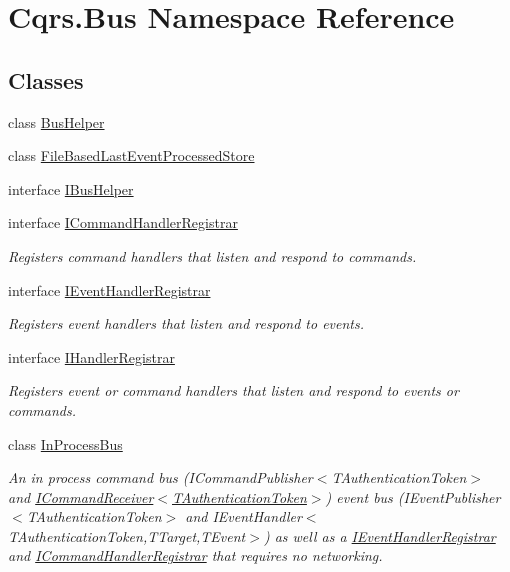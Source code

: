 \hypertarget{namespaceCqrs_1_1Bus}{}\section{Cqrs.\+Bus Namespace Reference}
\label{namespaceCqrs_1_1Bus}
\subsection*{Classes}
\begin{DoxyCompactItemize}
\item 
class \hyperlink{classCqrs_1_1Bus_1_1BusHelper}{Bus\+Helper}
\item 
class \hyperlink{classCqrs_1_1Bus_1_1FileBasedLastEventProcessedStore}{File\+Based\+Last\+Event\+Processed\+Store}
\item 
interface \hyperlink{interfaceCqrs_1_1Bus_1_1IBusHelper}{I\+Bus\+Helper}
\item 
interface \hyperlink{interfaceCqrs_1_1Bus_1_1ICommandHandlerRegistrar}{I\+Command\+Handler\+Registrar}
\begin{DoxyCompactList}\small\item\em Registers command handlers that listen and respond to commands. \end{DoxyCompactList}\item 
interface \hyperlink{interfaceCqrs_1_1Bus_1_1IEventHandlerRegistrar}{I\+Event\+Handler\+Registrar}
\begin{DoxyCompactList}\small\item\em Registers event handlers that listen and respond to events. \end{DoxyCompactList}\item 
interface \hyperlink{interfaceCqrs_1_1Bus_1_1IHandlerRegistrar}{I\+Handler\+Registrar}
\begin{DoxyCompactList}\small\item\em Registers event or command handlers that listen and respond to events or commands. \end{DoxyCompactList}\item 
class \hyperlink{classCqrs_1_1Bus_1_1InProcessBus}{In\+Process\+Bus}
\begin{DoxyCompactList}\small\item\em An in process command bus (I\+Command\+Publisher$<$\+T\+Authentication\+Token$>$ and \hyperlink{interfaceCqrs_1_1Commands_1_1ICommandReceiver}{I\+Command\+Receiver$<$\+T\+Authentication\+Token$>$}) event bus (I\+Event\+Publisher$<$\+T\+Authentication\+Token$>$ and I\+Event\+Handler$<$\+T\+Authentication\+Token,\+T\+Target,\+T\+Event$>$) as well as a \hyperlink{interfaceCqrs_1_1Bus_1_1IEventHandlerRegistrar}{I\+Event\+Handler\+Registrar} and \hyperlink{interfaceCqrs_1_1Bus_1_1ICommandHandlerRegistrar}{I\+Command\+Handler\+Registrar} that requires no networking. \end{DoxyCompactList}\item 

\end{DoxyCompactItemize}
